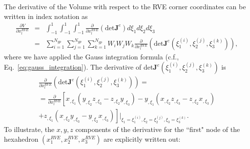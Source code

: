 The derivative of the Volume with respect to the RVE corner coordinates can be written in index notation as
%
\begin{eqnarray}
\frac{\partial V}{\partial x_l^{RVE}} &=& \int_{-1}^1 \int_{-1}^1 \int_{-1}^1 \frac{\partial}{\partial x_l^{RVE}} \left(\text{det}\pmb{J}^e\right) d\xi_1 d\xi_2 d\xi_3 \nonumber\\
%
&=& \sum_{i=1}^{N_{gp}} \sum_{j=1}^{N_{gp}} \sum_{k=1}^{N_{gp}} W_i W_j W_k \frac{\partial}{\partial x_l^{RVE}} \left(\text{det}\pmb{J}^e(\xi_1^{(i)},\xi_2^{(j)},\xi_3^{(k)})\right),
\label{eq:dVdvl}
\end{eqnarray}
%
where we have applied the Gauss integration formula (c.f., Eq.\ \eqref{eq:gauss_integration}). The derivative of det$\pmb{J}^e(\xi_1^{(i)},\xi_2^{(j)},\xi_3^{(k)})$ is 
%
\begin{multline}
\frac{\partial}{\partial x_l^{RVE}}\left(\text{det}\pmb{J}^e(\xi_1^{(i)},\xi_2^{(j)},\xi_3^{(k)})\right) =\\
= \frac{\partial}{\partial x_l^{RVE}}\left[x_{,\xi_1}\left(y_{,\xi_2}z_{,\xi_3} - z_{,\xi_2}y_{,\xi_3} \right) - y_{,\xi_1}\left(x_{,\xi_2}z_{,\xi_3}-z_{,\xi_2}x_{,\xi_3} \right) \right. \\
\left. + z_{,\xi_1}\left(x_{,\xi_2}y_{,\xi_3}-y_{,\xi_2}x_{,\xi_3} \right)\right] \bigg |_{\xi_1 = \xi_1^{(i)}, \xi_2 = \xi_2^{(j)}, \xi_3 = \xi_3^{(k)}}.
\end{multline}
%
To illustrate, the $x, y, z$ components of the derivative for the ``first" node of the hexahedron $(x_1^{RVE},x_2^{RVE}, x_3^{RVE})$ are explicitly written out:
%
